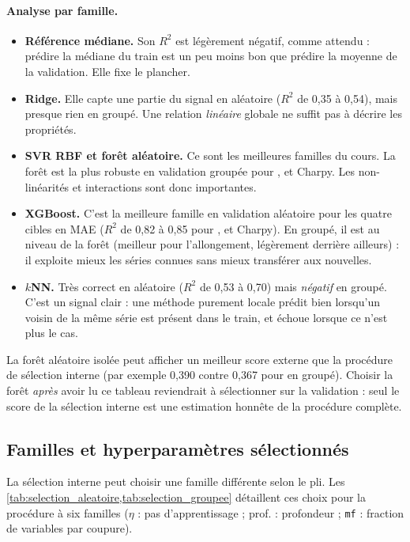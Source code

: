 \paragraph{Analyse par famille.}
\begin{itemize}
  \item \textbf{Référence médiane.} Son $R^2$ est légèrement négatif, comme attendu : prédire la médiane du train est un peu moins bon que prédire la moyenne de la validation. Elle fixe le plancher.
  \item \textbf{Ridge.} Elle capte une partie du signal en aléatoire ($R^2$ de 0,35 à 0,54), mais presque rien en groupé. Une relation \emph{linéaire} globale ne suffit pas à décrire les propriétés.
  \item \textbf{SVR RBF et forêt aléatoire.} Ce sont les meilleures familles du cours. La forêt est la plus robuste en validation groupée pour \YS, \UTS{} et Charpy. Les non-linéarités et interactions sont donc importantes.
  \item \textbf{XGBoost.} C'est la meilleure famille en validation aléatoire pour les quatre cibles en MAE ($R^2$ de 0,82 à 0,85 pour \YS, \UTS{} et Charpy). En groupé, il est au niveau de la forêt (meilleur pour l'allongement, légèrement derrière ailleurs) : il exploite mieux les séries connues sans mieux transférer aux nouvelles.
  \item \textbf{$k$NN.} Très correct en aléatoire ($R^2$ de 0,53 à 0,70) mais \emph{négatif} en groupé. C'est un signal clair : une méthode purement locale prédit bien lorsqu'un voisin de la même série est présent dans le train, et échoue lorsque ce n'est plus le cas.
\end{itemize}

\begin{precaution}
La forêt aléatoire isolée peut afficher un meilleur score externe que la
procédure de sélection interne (par exemple 0,390 contre 0,367 pour \YS{} en
groupé). Choisir la forêt \emph{après} avoir lu ce tableau reviendrait à
sélectionner sur la validation : seul le score de la sélection interne est une
estimation honnête de la procédure complète.
\end{precaution}

\subsection{Familles et hyperparamètres sélectionnés}

La sélection interne peut choisir une famille différente selon le pli. Les
\cref{tab:selection_aleatoire,tab:selection_groupee} détaillent ces choix pour la
procédure à six familles ($\eta$ : pas d'apprentissage ; prof. : profondeur ;
\texttt{mf} : fraction de variables par coupure).

